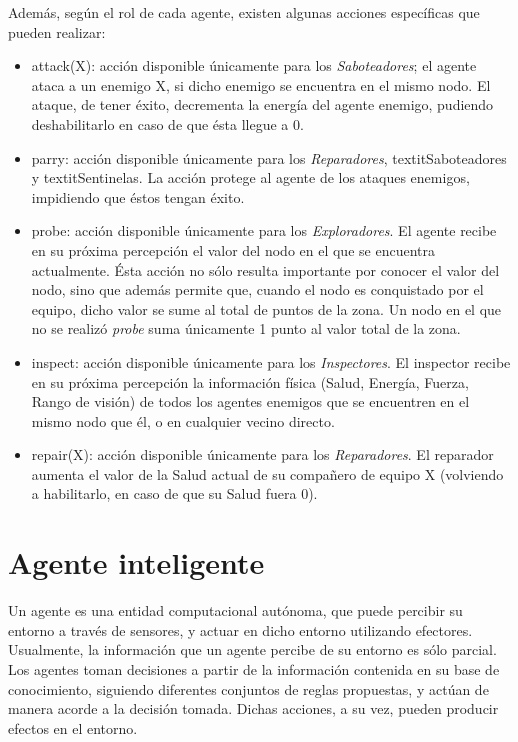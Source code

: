  Además, según el rol de cada agente, existen algunas acciones
 específicas que pueden realizar:
 
 \begin{itemize}
 
 \item attack(X): acción disponible únicamente para los
 \textit{Saboteadores}; el agente ataca a un enemigo X, si dicho
 enemigo se encuentra en el mismo nodo.
 El ataque, de tener éxito, decrementa la energía del agente enemigo,
 pudiendo deshabilitarlo en caso de que ésta llegue a 0.

 \item parry: acción disponible únicamente para los
 \textit{Reparadores}, textit{Saboteadores} y textit{Sentinelas}.
 La acción protege al agente de los ataques enemigos, impidiendo que
 éstos tengan éxito.
 
 \item probe: acción disponible únicamente para los 
 \textit{Exploradores}.
 El agente recibe en su próxima percepción el valor del nodo en el que
 se encuentra actualmente.
 Ésta acción no sólo resulta importante por conocer el valor del nodo,
 sino que además permite que, cuando el nodo es conquistado por el
 equipo, dicho valor se sume al total de puntos de la zona.
 Un nodo en el que no se realizó \textit{probe} suma únicamente 1 punto
 al valor total de la zona.
 
 \item inspect: acción disponible únicamente para los
 \textit{Inspectores}.
 El inspector recibe en su próxima percepción la información física
 (Salud, Energía, Fuerza, Rango de visión) de todos los agentes
 enemigos que se encuentren en el mismo nodo que él, o en cualquier
 vecino directo.
 
 \item repair(X): acción disponible únicamente para los
 \textit{Reparadores}.
 El reparador aumenta el valor de la Salud actual de su compañero de
 equipo X (volviendo a habilitarlo, en caso de que su Salud fuera 0).
 
 \end{itemize}

\section{Agente inteligente}
\label{sec:agente_inteligente}
 
 Un agente es una entidad computacional autónoma, que puede percibir su
 entorno a través de sensores, y actuar en dicho entorno utilizando
 efectores.
 Usualmente, la información que un agente percibe de su entorno es sólo
 parcial.
 Los agentes toman decisiones a partir de la información contenida en
 su base de conocimiento, siguiendo diferentes conjuntos de reglas
 propuestas, y actúan de manera acorde a la decisión tomada.
 Dichas acciones, a su vez, pueden producir efectos en el entorno.
 

